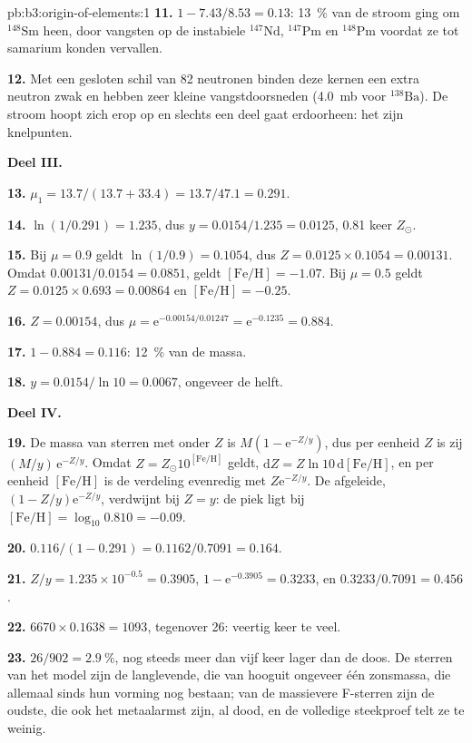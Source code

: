\begin{solution}{pb:b3:origin-of-elements:1}
\textbf{11.} $1 - 7.43/8.53 = \num{0.13}$: \qty{13}{\percent} van de stroom ging
om $^{148}\mathrm{Sm}$ heen, door vangsten op de instabiele
$^{147}\mathrm{Nd}$, $^{147}\mathrm{Pm}$ en $^{148}\mathrm{Pm}$ voordat
ze tot samarium konden vervallen.

\textbf{12.} Met een gesloten schil van 82 neutronen binden deze kernen een extra
neutron zwak en hebben zeer kleine vangstdoorsneden (\qty{4.0}{mb}
voor $^{138}\mathrm{Ba}$). De stroom hoopt zich erop op en slechts een deel
gaat erdoorheen: het zijn knelpunten.

\textbf{Deel III.}

\textbf{13.} $\mu_1 = 13.7/(13.7 + 33.4) = 13.7/47.1 = \num{0.291}$.

\textbf{14.} $\ln(1/0.291) = \num{1.235}$, dus $y = 0.0154/1.235 = \num{0.0125}$,
\num{0.81} keer $Z_\odot$.

\textbf{15.} Bij $\mu = 0.9$ geldt $\ln(1/0.9) = 0.1054$, dus $Z = 0.0125\times0.1054 =
\num{0.00131}$. Omdat $0.00131/0.0154 = 0.0851$, geldt $[\mathrm{Fe/H}] =
-1.07$. Bij $\mu = 0.5$ geldt $Z = 0.0125\times0.693 = \num{0.00864}$ en
$[\mathrm{Fe/H}] = -0.25$.

\textbf{16.} $Z = 0.00154$, dus $\mu = \mathrm{e}^{-0.00154/0.01247} =
\mathrm{e}^{-0.1235} = \num{0.884}$.

\textbf{17.} $1 - 0.884 = \num{0.116}$: \qty{12}{\percent} van de massa.

\textbf{18.} $y = 0.0154/\ln 10 = \num{0.0067}$, ongeveer de helft.

\textbf{Deel IV.}

\textbf{19.} De massa van sterren met  onder $Z$ is
$M(1 - \mathrm{e}^{-Z/y})$, dus per eenheid $Z$ is zij
$(M/y)\,\mathrm{e}^{-Z/y}$. Omdat $Z = Z_\odot10^{[\mathrm{Fe/H}]}$ geldt,
$\mathrm{d}Z = Z\ln 10\,\mathrm{d}[\mathrm{Fe/H}]$, en per eenheid
$[\mathrm{Fe/H}]$ is de verdeling evenredig met
$Z\mathrm{e}^{-Z/y}$. De afgeleide,
$(1 - Z/y)\mathrm{e}^{-Z/y}$, verdwijnt bij $Z = y$: de piek ligt bij
$[\mathrm{Fe/H}] = \log_{10}0.810 = -0.09$.

\textbf{20.} $\num{0.116}/(1 - 0.291) = 0.1162/0.7091 = \num{0.164}$.

\textbf{21.} $Z/y = 1.235\times10^{-0.5} = 0.3905$, $1 - \mathrm{e}^{-0.3905} =
0.3233$, en $0.3233/0.7091 = \num{0.456}$.

\textbf{22.} $6670\times0.1638 = 1093$, tegenover 26: veertig keer te veel.

\textbf{23.} $26/902 = \qty{2.9}{\percent}$, nog steeds meer dan vijf keer lager dan
de doos. De sterren van het model zijn de langlevende, die van hooguit
ongeveer één zonsmassa, die allemaal sinds hun vorming nog bestaan; van
de massievere F-sterren zijn de oudste, die ook het metaalarmst zijn,
al dood, en de volledige steekproef telt ze te weinig.


\end{solution}

